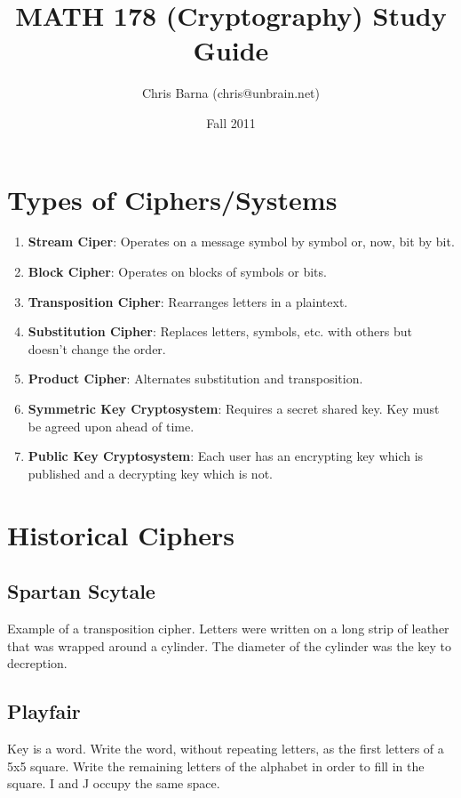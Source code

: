 \documentclass{article}
\begin{document}
\title{MATH 178 (Cryptography) Study Guide}
\author{Chris Barna (chris@unbrain.net)}
\date{Fall 2011}

\maketitle

\section{Types of Ciphers/Systems}
\begin{enumerate}
  \item \textbf{Stream Ciper}: Operates on a message symbol by symbol or, now,
    bit by bit.
  \item \textbf{Block Cipher}: Operates on blocks of symbols or bits.
  \item \textbf{Transposition Cipher}: Rearranges letters in a plaintext.
  \item \textbf{Substitution Cipher}: Replaces letters, symbols, etc. with
    others but doesn't change the order.
  \item \textbf{Product Cipher}: Alternates substitution and transposition.
  \item \textbf{Symmetric Key Cryptosystem}: Requires a secret shared key. Key
    must be agreed upon ahead of time.
  \item \textbf{Public Key Cryptosystem}: Each user has an encrypting key which
    is published and a decrypting key which is not.
\end{enumerate}

\section{Historical Ciphers}

\subsection{Spartan Scytale}
Example of a transposition cipher. Letters were written on a long strip of
leather that was wrapped around a cylinder. The diameter of the cylinder was
the key to decreption.

\subsection{Playfair}
Key is a word. Write the word, without repeating letters, as the first letters
of a 5x5 square. Write the remaining letters of the alphabet in order to fill
in the square. I and J occupy the same space.
\end{document}
